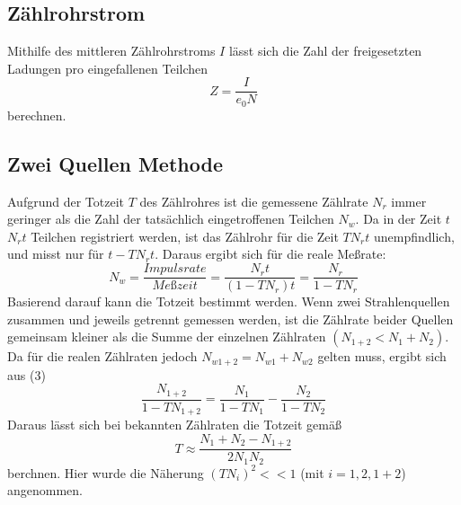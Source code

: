 \subsection{Zählrohrstrom}
Mithilfe des mittleren Zählrohrstroms $I$ lässt sich die Zahl der freigesetzten Ladungen pro eingefallenen Teilchen 
\begin{equation}
    \label{eq:zaehlrohrstrom}
Z=\frac{I}{e_0N}
\end{equation}
berechnen. 
\subsection{Zwei Quellen Methode}
Aufgrund der Totzeit $T$ des Zählrohres ist die gemessene Zählrate $N_r$ immer geringer als die Zahl der tatsächlich eingetroffenen Teilchen $N_w$. Da in der Zeit $t$ $N_rt$ Teilchen registriert werden, ist das Zählrohr für die Zeit $TN_rt$ unempfindlich, und misst nur für $t-TN_rt$. Daraus ergibt sich für die reale Meßrate:
\begin{equation}
N_w=\frac{Impulsrate}{Meßzeit}=\frac{N_rt}{(1-TN_r)t}=\frac{N_r}{1-TN_r}
\end{equation}
Basierend darauf kann die Totzeit bestimmt werden. Wenn zwei Strahlenquellen zusammen und jeweils getrennt gemessen werden, ist die Zählrate beider Quellen gemeinsam kleiner als die Summe der einzelnen Zählraten $(N_{1+2}<N_1+N_2)$. Da für die realen Zählraten jedoch $N_{w1+2}=N_{w1}+N_{w2}$ gelten muss, ergibt sich aus (3)
\begin{equation}
\frac{N_{1+2}}{1-TN_{1+2}}=\frac{N_1}{1-TN_1}-\frac{N_2}{1-TN_2}
\end{equation}
Daraus lässt sich bei bekannten Zählraten die Totzeit gemäß
\begin{equation}
    \label{eq:totzeit}
T\approx\frac{N_1+N_2-N_{1+2}}{2N_1N_2}
\end{equation}
berchnen. Hier wurde die Näherung $(TN_i)^2<<1$ (mit $i=1,2,1+2$) angenommen. 
